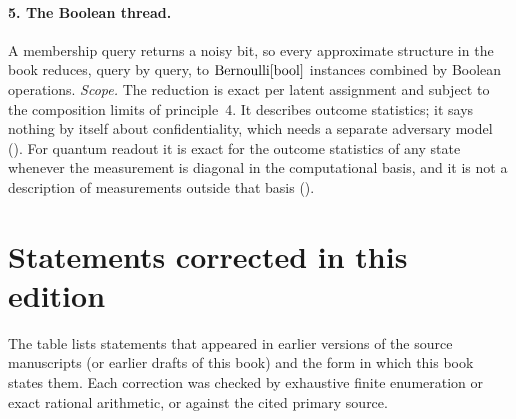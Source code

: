 \paragraph{5. The Boolean thread.}
A membership query returns a noisy bit, so every approximate structure in the
book reduces, query by query, to $\mathrm{Bernoulli}[\mathrm{bool}]$ instances combined by
Boolean operations. \emph{Scope.} The reduction is exact per latent assignment
and subject to the composition limits of principle~4. It describes outcome
statistics; it says nothing by itself about confidentiality, which needs a
separate adversary model ().
For quantum readout it is exact for the outcome statistics of any state
whenever the measurement is diagonal in the computational basis, and it is not
a description of measurements outside that basis
().

\section*{Statements corrected in this edition}

The table lists statements that appeared in earlier versions of the source
manuscripts (or earlier drafts of this book) and the form in which this book
states them. Each correction was checked by exhaustive finite enumeration or
exact rational arithmetic, or against the cited primary source.


